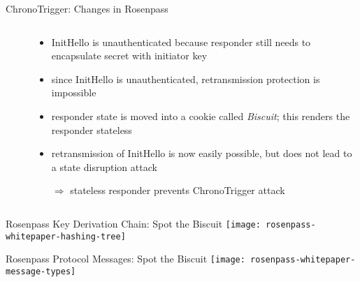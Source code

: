 \begin{frame}{ChronoTrigger: Changes in Rosenpass}
  \begin{columns}[fullwidth,c]

    \begin{column}{.2\linewidth}
    \end{column}

    \begin{column}{.2\linewidth}
    \end{column}

    \begin{column}{.56\linewidth}
    \small
      \begin{itemize}
        \item InitHello is unauthenticated because responder still needs to encapsulate secret with initiator key
        \item since InitHello is unauthenticated, retransmission protection is impossible
        \item responder state is moved into a cookie called \emph{Biscuit}; this renders the responder stateless
        \item retransmission of InitHello is now easily possible, but does not lead to a state disruption attack
        \item[$\Rightarrow$] stateless responder prevents ChronoTrigger attack
      \end{itemize}
    \end{column}
  \end{columns}
\end{frame}

\begin{frame}{Rosenpass Key Derivation Chain: Spot the Biscuit}
  \centering
  \texttt{[image: rosenpass-whitepaper-hashing-tree]}
\end{frame}


\begin{frame}{Rosenpass Protocol Messages: Spot the Biscuit}
\centering
    \texttt{[image: rosenpass-whitepaper-message-types]}
\end{frame}

